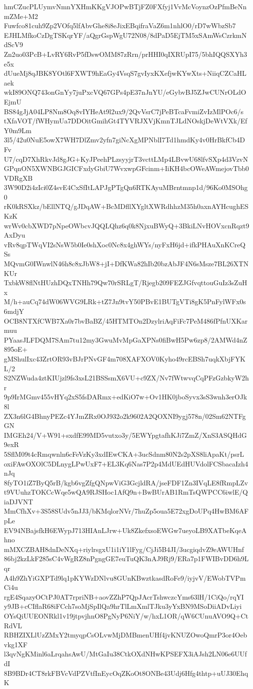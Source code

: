 hmCZucPLUymvNmnYXHmKKgVJOPwBTjFZ0FXfyj1VvMcVoynzOzPfmBeNnmZMe+M2
Fuwfco81cuh9Zp2VOfq5lfAbvGhe8i8eJixEBqifraVaZ6m1nhlO0/rD7wWbzSb7
EJHLMfkoCzDgTSKqrYF/aQgrGspWgU72N08/8dPaD5EjTM5xSAmWsCzrkmNdScV9
Zn2uo03PcB+LvRY6RvP5fDswOMM87zRrn/prHHI0qIXRUpI75/5bhIQQSXYh3e5x
dUueMj8qJBK8YOtl6FXWT9hEaGy4VsqS7gvIyxKXefjwKYwXts+NiiqCZCaHLaek
wkI89ONQ743onGnYy7juPxcVQ67GPs4pE37nJnYU/eGybvBJ5ZJwCUNrOLdOEjmU
BS84gJjA04LP8Nm8Oq8vIYHeAt9l2ux9/2QvVsrC7jPeBTcaFvmiZvIzMlPOc6/s
tXfaVOT/fWHymUa7DDOitGmihGt4TYVRJXVjKmnTJLdNOskjDeWtVXk/EfY0m9Lm
3l5/42u0NuE5owX7WH7DlZmv2yfn7giNcXgMPNblI7Td1hmdKy4v0HrBkfCb4DFv
U7/cqD7XhRkvJd8gJG+KyJPeehPLzsyyjrT3vcttLMp4LBvwU68lfvSXp4d3VzvN
GPqnON5XWNBGJGICFxdyGbiU7WvxwpGFcinm+IiKH4bcOWeAWmejovTbb0VDRgXB
3W90D2i4zIci0Z4svE4CxSfItLAPJgPTgQn6RTKAyuMBrntmnp1d/96Ko0MSOhg0
rK0kRSXkz/bEllNTQ/gJDqAW+BcMDfllXYgltXWRdhhzM35h0axnAYHcughESKzK
wrWv0cbXWD7pNpeOWbcvJQQLQhz6q0k8NjxuBWyQ+3BkiLNvHOVxcnRqzt9AxDyu
vRv8qpTWqVI2sNsW5b0Ie0shXoc0Nc8x4ghWYs/nyFxH6jd+ifkPHAuXnKCreQSs
MQvmG0IWnwlN46h8c8xJbW8+jI+DfKWa82hIb20bzAbJF4N6sMsze7BL26XTNKUr
TxbkW8flNtHUzhDQxTNHh79Qw70rSRLgT/Rjegb209FEZJGfvqttouGuIz3sZuHx
M/h+auCq74dW06WVG9LRk+tZ7Jn9tvY50PBvE1BUTgVTi8gK5PnFylWFx0s6mdjY
OCB8NTXfCWB7Xa0r7bvBaBZ/45HTMTOn2DzylriAqFiFc7PeM486fPfnUXKarmuu
PYaasJLFDQM7SAm7tu12my3GwuMvMpGaXPNs0fiBwH5Pw6zp8/2AMWd4nZ895oE+
gMShulIxc43ZrtOR93vBJrPNvGF4m708XAFXOV0Kyho49rcEBSh7uqkXbjFYKL/2
S2NZWuda4ztKIUjzl9fs3xsL21BSSsmX6VU+c9ZX/Nv7fWtwvqCqPFzGzbkyW2hr
9p9IrMGmv455vHYq2xS5fsDARmx+edKiO7w+Ov1HK0jboSyvx3sS3wnh3erOJk8l
ZX3n6lG4BhnyPEZc4YJmZRx0OJ932o2k9602A2QOXNI9ygj578n/02Sm62NTFgGN
IMGEh24/V+W91+sxdfE99MD5vutxo3y/5EWYpgtafhKJi7ZmZ/XnS3ASQHdG9exR
5SflM09t4cRmqwnln6cFeVzKy3xdIEwCKA+3ucSdnm80N2s2pXS8liApaKt/psrL
oxiFAwOXOlC5DLnygLPwUxF7+EL3Kq6Nas7P2p4MdUEdHUVdolFCSbacaIzh4nJq
8fyTO1iZ7ByQ5rB/kgb6vgZfgQNpwViG3GcjldRA/jseFDF1Zn3IVqLE8fRmpLZv
t9VUuhzTOKCcWqe5wQA9RJSHoc1AfQ9n+BwBUrAB1RmTsQWPCC6iwlE/QiaDJVNT
MmCfhXv+3S58SUdv5nJJ3/bKMqlorNVr/7huZp5oua5E72xgDoUPq4HwBM6AFpLe
EV94NBajsfkH6EWypJ713HIAnLJrw+Uk8ZkefxsoEWGw7ueyoLB9XATbeKqeAhno
mMXCZBAH8dnDeNXq+riylrsgxU1i1iY1lFyg/CjJi5B4JI/3ucgiqdvZ9eAWUHnf
86bj2kzLkF285sC4vWgRZ8nPgngGE7euTuQK3nAJ9Rj9/ERa7p1FWIBvDD6h9Lqr
A4h9ZhYiGXPTd9lq1pKYWzDNlvu8GUnKBwztkasdRoFe9/iyjvV/EWobTVPmCi4u
rgE4SqazyOCtPJ0AT7rpriNB+aovZZhP7QpJAcrTshwczcYms63lH/1CiQo/rqYI
y9JB+cCIflaR68iFCch7soMjSpIlQa9hrTlLmXmlTJku3yYxBN9MSoDiiADvLiyi
OYsQiUUEONRkl1v19jtpvjhnO8PgNyP6NiY/w/hxL1OR/qW6CUnuAVO9Q+CtRdVL
RBHZIXLlUzZMxY2tmyqpCsOLvwMjDMBmenUHf4jvKNUZOwoQmrP3or4Oebvkg1XF
l3qvNgKMinl6aLrqahsAwU/MtGaIu38CtkOXdNHwKPSEFX3iAJsh2LN06e6UUfdI
8B9BDr4CT8rkFBVcVdPZVtfInEycOqZKoOt8ONBe43Udj6Hfg4thtp+uUJ30EhqK
